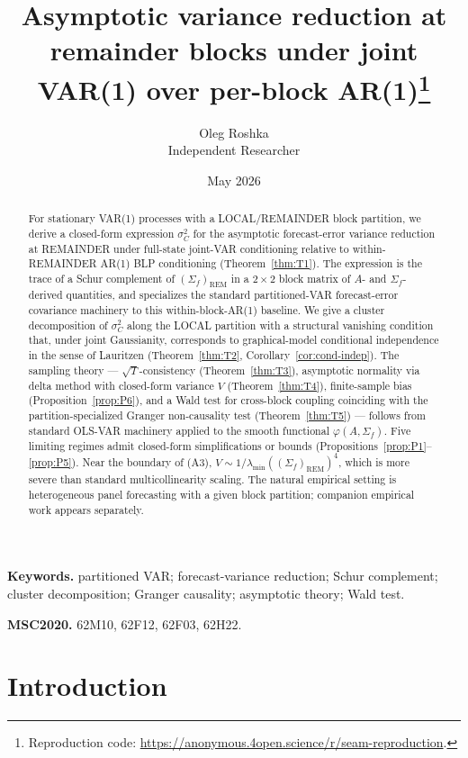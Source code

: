 \documentclass[11pt,letterpaper]{article}
\title{Asymptotic variance reduction at remainder blocks under joint VAR(1) over per-block AR(1)\thanks{Reproduction code: \url{https://anonymous.4open.science/r/seam-reproduction}.}}
\author{Oleg Roshka\\[2pt]\small Independent Researcher}
\date{May 2026}
\theoremstyle{remark}
\newcommand{\REM}{\mathrm{REM}}
\begin{document}
\maketitle

\begin{abstract}
For stationary VAR(1) processes with a LOCAL/REMAINDER block partition, we derive a closed-form expression $\sigma^2_C$ for the asymptotic forecast-error variance reduction at REMAINDER under full-state joint-VAR conditioning relative to within-REMAINDER AR(1) BLP conditioning (Theorem~\ref{thm:T1}). The expression is the trace of a Schur complement of $(\Sigma_f)_\REM$ in a $2 \times 2$ block matrix of $A$- and $\Sigma_f$-derived quantities, and specializes the standard partitioned-VAR forecast-error covariance machinery \cite[Ch.~2.2.2--3.5]{Lutkepohl2005} to this within-block-AR(1) baseline. We give a cluster decomposition of $\sigma^2_C$ along the LOCAL partition with a structural vanishing condition that, under joint Gaussianity, corresponds to graphical-model conditional independence in the sense of Lauritzen \cite{Lauritzen1996} (Theorem~\ref{thm:T2}, Corollary~\ref{cor:cond-indep}). The sampling theory --- $\sqrt{T}$-consistency (Theorem~\ref{thm:T3}), asymptotic normality via delta method with closed-form variance $V$ (Theorem~\ref{thm:T4}), finite-sample bias (Proposition~\ref{prop:P6}), and a Wald test for cross-block coupling coinciding with the partition-specialized Granger non-causality test (Theorem~\ref{thm:T5}) --- follows from standard OLS-VAR machinery applied to the smooth functional $\varphi(A, \Sigma_f)$. Five limiting regimes admit closed-form simplifications or bounds (Propositions~\ref{prop:P1}--\ref{prop:P5}). Near the boundary of (A3), $V \sim 1/\lambda_{\min}((\Sigma_f)_\REM)^4$, which is more severe than standard multicollinearity scaling. The natural empirical setting is heterogeneous panel forecasting with a given block partition; companion empirical work appears separately.
\end{abstract}

\noindent\textbf{Keywords.} partitioned VAR; forecast-variance reduction; Schur complement; cluster decomposition; Granger causality; asymptotic theory; Wald test.

\smallskip
\noindent\textbf{MSC2020.} 62M10, 62F12, 62F03, 62H22.

\section{Introduction}\label{sec:intro}
\end{document}
